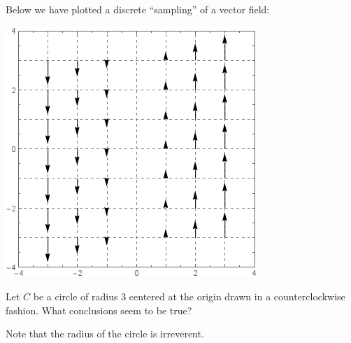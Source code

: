 \documentclass{ximera}
\begin{document}
\begin{exercise}
  Below we have plotted a discrete ``sampling'' of a vector field:
  \begin{image}
    \includegraphics{field7.png}
  \end{image}
  Let $C$ be a circle of radius $3$ centered at the origin drawn in a
  counterclockwise fashion.  What conclusions seem to be true?
  \begin{selectAll}
  \end{selectAll}
  \begin{hint}
    Note that the radius of the circle is irreverent. 
  \end{hint}
\end{exercise}
\end{document}
